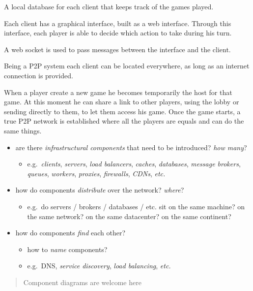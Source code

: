 \documentclass{scrartcl}
\begin{document}
A local database for each client that keeps track of the games played.

Each client has a graphical interface, built as a web interface.
%
Through this interface, each player is able to decide which action to take during his turn.

A web socket is used to pass messages between the interface and the client.

Being a P2P system each client can be located everywhere, as long as an internet connection is provided.

When a player create a new game he becomes temporarily the host for that game.
%
At this moment he can share a link to other players, using the lobby or sending directly to them, to let them access his game.
%
Once the game starts, a true P2P network is established where all the players are equals and can do the same things.

\begin{itemize}
  \item are there \emph{infrastructural components} that need to be
  introduced? \emph{how many}?

  \begin{itemize}
    \item e.g.~\emph{clients}, \emph{servers}, \emph{load balancers},
    \emph{caches}, \emph{databases}, \emph{message brokers},
    \emph{queues}, \emph{workers}, \emph{proxies}, \emph{firewalls},
    \emph{CDNs}, \emph{etc.}
  \end{itemize}
  \item how do components \emph{distribute} over the network? \emph{where}?

  \begin{itemize}
    \item e.g.~do servers / brokers / databases / etc. sit on the same
    machine? on the same network? on the same datacenter? on the same
    continent?
  \end{itemize}
  \item how do components \emph{find} each other?

  \begin{itemize}
    \item how to \emph{name} components?
    \item e.g.~DNS, \emph{service discovery}, \emph{load balancing},
    \emph{etc.}
  \end{itemize}
\end{itemize}

\begin{quote}
Component diagrams are welcome here
\end{quote}
\end{document}
